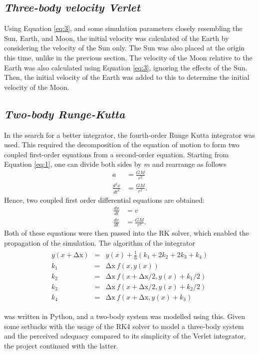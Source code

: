 \documentclass[11pt, english]{report}
\begin{document}
\subsection{\textsl{Three-body velocity Verlet}}
\noindent \normalsize{Using Equation \ref{eq:3}, and some simulation parameters closely resembling the Sun, Earth, and Moon, the initial velocity was calculated of the Earth by considering the velocity of the Sun only. The Sun was also placed at the origin this time, unlike in the previous section. The velocity of the Moon relative to the Earth was also calculated using Equation \ref{eq:3}, ignoring the effects of the Sun. Then, the initial velocity of the Earth was added to this to determine the initial velocity of the Moon.}

\subsection{\textsl{Two-body Runge-Kutta}}
\normalsize{\noindent In the search for a better integrator, the fourth-order Runge Kutta integrator was used. This required the decomposition of the equation of motion to form two coupled first-order equations from a second-order equation. Starting from Equation \ref{eq:1}, one can divide both sides by $m$ and rearrange as follows
\begin{align}
    a &= \frac{GM}{r^2} \\
    \frac{d^2x}{dt^2} &= \frac{GM}{r^2}.
\end{align}
Hence, two coupled first order differential equations are obtained:
\begin{align}
    \frac{dx}{dt} &= v \\
    \frac{dv}{dt} &= \frac{GM}{r^2}.
\end{align}
Both of these equations were then passed into the RK solver, which enabled the propagation of the simulation. The algorithm of the integrator \cite{bowler_phas0030_nodate}
\begin{align}
\begin{matrix} 
y(x+\mathrm{\Delta x})&=&y(x)+\frac{1}{6}\left(k_1+2k_2+2k_3+k_4\right)\\k_1&=&\mathrm{\Delta x}\ f(x,y(x))\\k_2&=&\mathrm{\Delta x}\ f(x+\mathrm{\Delta x}/2,y(x)+k_1/2)\\k_3&=&\mathrm{\Delta x}\ f(x+\mathrm{\Delta x}/2,y(x)+k_2/2)\\k_4&=&\mathrm{\Delta x}\ f(x+\mathrm{\Delta x},y(x)+k_3) \end{matrix}
\end{align}

\noindent was written in Python, and a two-body system was modelled using this. Given some setbacks with the usage of the RK4 solver to model a three-body system and the perceived adequacy compared to its simplicity of the Verlet integrator, the project continued with the latter.}
\end{document}
